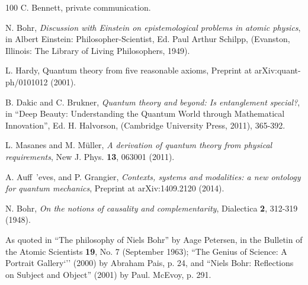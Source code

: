\documentclass[12pt]{article}
\begin{document}
\begin {thebibliography}{100}
 C. Bennett, private communication.

 N. Bohr, {\it Discussion with Einstein on epistemological problems in atomic physics}, in Albert Einstein: Philosopher-Scientist, Ed. Paul Arthur Schilpp, (Evanston, Illinois: The Library of Living Philosophers, 1949).

 L. Hardy, Quantum theory from five reasonable axioms, Preprint at arXiv:quant-ph/0101012 (2001).

 B. Dakic and C. Brukner, {\it Quantum theory and beyond: Is entanglement special?}, in ``Deep Beauty: Understanding the Quantum World through Mathematical Innovation'', Ed. H. Halvorson, (Cambridge University Press, 2011), 365-392.

 L. Masanes and M. M{\" u}ller, {\it A derivation of quantum theory from physical requirements}, New J. Phys. {\bf 13}, 063001 (2011).

 A. Auff{\ 'e}ves, and P. Grangier, {\it Contexts, systems and modalities: a new ontology for quantum mechanics}, Preprint at arXiv:1409.2120 (2014).

 N. Bohr, {\it On the notions of causality and complementarity}, Dialectica {\bf 2}, 312-319 (1948).

 As quoted in ``The philosophy of Niels Bohr'' by Aage Petersen, in the Bulletin of the Atomic Scientists {\bf 19}, No. 7 (September 1963); ``The Genius of Science: A Portrait Gallery`'' (2000) by Abraham Pais, p. 24, and ``Niels Bohr: Reflections on Subject and Object'' (2001) by Paul. McEvoy, p. 291.


\end{thebibliography}
\end{document}
